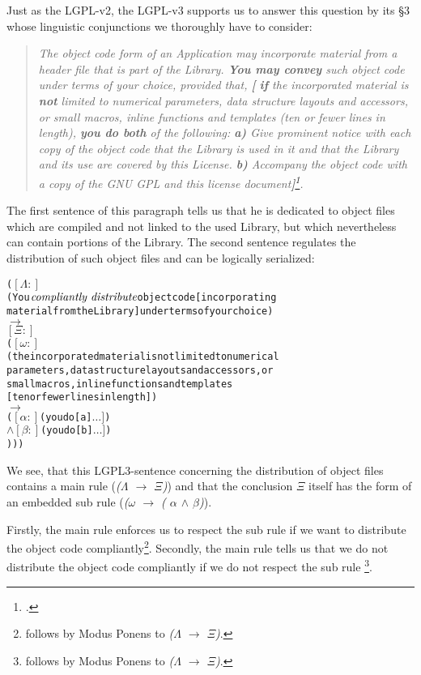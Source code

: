 Just as the LGPL-v2, the LGPL-v3 supports us to answer this question by its §3
whose linguistic conjunctions we thoroughly have to consider:

\begin{quote}\emph{The object code form of an Application may incorporate
material from a header file that is part of the Library. \textbf{You may convey}
such object code under terms of your choice, \emph{provided that}, \textbf{[}
\textbf{if} the incorporated material is \textbf{not} limited to numerical
parameters, data structure layouts and accessors, or small macros, inline
functions and templates (ten or fewer lines in length), \textbf{you do both} of
the following: \textbf{a)} Give prominent notice with each copy of the object
code that the Library is used in it and that the Library and its use are covered
by this License. \textbf{b)} Accompany the object code with a copy of the GNU
GPL and this license document\textbf{]}\footcite[cf.][\nopage wp., §3; emphasis
and additional braces KR.]{Lgpl30OsiLicense2007a}.}
\end{quote}

The first sentence of this paragraph tells us that he is dedicated to object
files which are compiled and not linked to the used Library, but which
nevertheless can contain portions of the Library. The second sentence regulates
the distribution of such object files and can be logically serialized:

\begin{alltt}
( \([\Lambda:]\)
  ( You \(\emph{compliantly distribute}\) object code [incorporating 
    material from the Library] under terms of your choice ) 
  \(\rightarrow\)  
  \([\Xi:]\)
  ( \([\omega:]\)
    ( the incorporated material is not limited to numerical
      parameters, data structure layouts and accessors, or 
      small macros, inline functions and templates 
      [ten or fewer lines in length] ) 
    \(\rightarrow\) 
    ( \([\alpha:]\) ( you do [a] \(\ldots]\) )
    \(\wedge\) \([\beta:]\) ( you do [b] \(\ldots]\) )
) ) )
\end{alltt}  

We see, that this LGPL3-sentence concerning the distribution of object files
contains a main rule (\emph{($\Lambda$ $\rightarrow$ $\Xi$)}) and that the
conclusion $\Xi$ itself has the form of an embedded sub rule (\emph{($\omega$
$\rightarrow$ ( $\alpha$ $\wedge$ $\beta$)}).

Firstly, the main rule enforces us to respect the sub rule if we want to
distribute the object code compliantly\footnote{follows by Modus Ponens to
\emph{($\Lambda$ $\rightarrow$ $\Xi$)}.}. Secondly, the main rule tells us that
we do not distribute the object code compliantly if we do not respect the sub
rule \footnote{follows by Modus Ponens to \emph{($\Lambda$ $\rightarrow$
$\Xi$)}.}.

